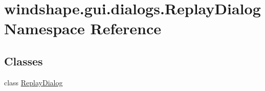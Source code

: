 \hypertarget{namespacewindshape_1_1gui_1_1dialogs_1_1_replay_dialog}{}\section{windshape.\+gui.\+dialogs.\+Replay\+Dialog Namespace Reference}
\label{namespacewindshape_1_1gui_1_1dialogs_1_1_replay_dialog}
\subsection*{Classes}
\begin{DoxyCompactItemize}
\item 
class \mbox{\hyperlink{classwindshape_1_1gui_1_1dialogs_1_1_replay_dialog_1_1_replay_dialog}{Replay\+Dialog}}
\end{DoxyCompactItemize}
